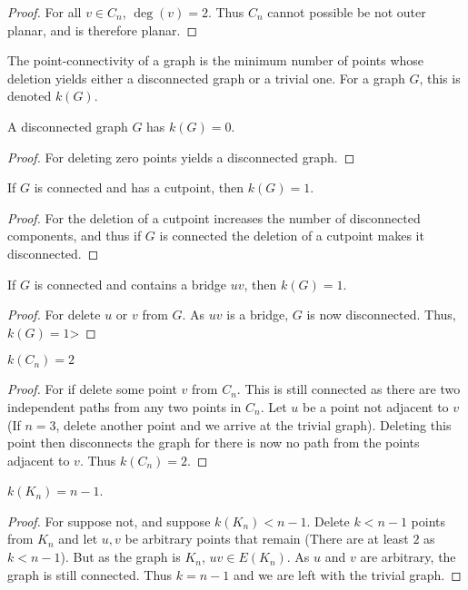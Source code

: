     \begin{proof}
    For all $v\in C_n$, $\deg(v)=2$. Thus $C_n$ cannot possible be not outer planar, and is therefore planar.
    \end{proof}
    \begin{definition}
    The point-connectivity of a graph is the minimum number of points whose deletion yields either a disconnected graph or a trivial one. For a graph $G$, this is denoted $k(G)$.
    \end{definition}
    \begin{theorem}
    A disconnected graph $G$ has $k(G) = 0$.
    \end{theorem}
    \begin{proof}
    For deleting zero points yields a disconnected graph.
    \end{proof}
    \begin{theorem}
    If $G$ is connected and has a cutpoint, then $k(G) = 1$.
    \end{theorem}
    \begin{proof}
    For the deletion of a cutpoint increases the number of disconnected components, and thus if $G$ is connected the deletion of a cutpoint makes it disconnected.
    \end{proof}
    \begin{theorem}
    If $G$ is connected and contains a bridge $uv$, then $k(G)=1$.
    \end{theorem}
    \begin{proof}
    For delete $u$ or $v$ from $G$. As $uv$ is a bridge, $G$ is now disconnected. Thus, $k(G) = 1$>
    \end{proof}
    \begin{theorem}
    $k(C_n) =2$
    \end{theorem}
    \begin{proof}
    For if delete some point $v$ from $C_n$. This is still connected as there are two independent paths from any two points in $C_n$. Let $u$ be a point not adjacent to $v$ (If $n=3$, delete another point and we arrive at the trivial graph). Deleting this point then disconnects the graph for there is now no path from the points adjacent to $v$. Thus $k(C_n)=2$.
    \end{proof}
    \begin{theorem}
    $k(K_n) = n-1$.
    \end{theorem}
    \begin{proof}
    For suppose not, and suppose $k(K_n)<n-1$. Delete $k<n-1$ points from $K_n$ and let $u,v$ be arbitrary points that remain (There are at least $2$ as $k<n-1$). But as the graph is $K_n$, $uv\in E(K_n)$. As $u$ and $v$ are arbitrary, the graph is still connected. Thus $k=n-1$ and we are left with the trivial graph.
    \end{proof}
